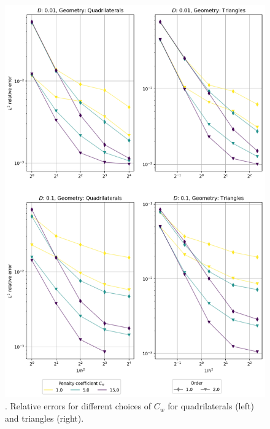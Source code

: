 \begin{figure}[p!]
	\includegraphics[width=\textwidth]{../figs/parametric/burgers_2D/convergence_symmetry}
	\caption{. Relative errors for different choices of $C_w$ for
	quadrilaterals (left) and triangles (right).}
	\label{fig:kucera_conv}
\end{figure}